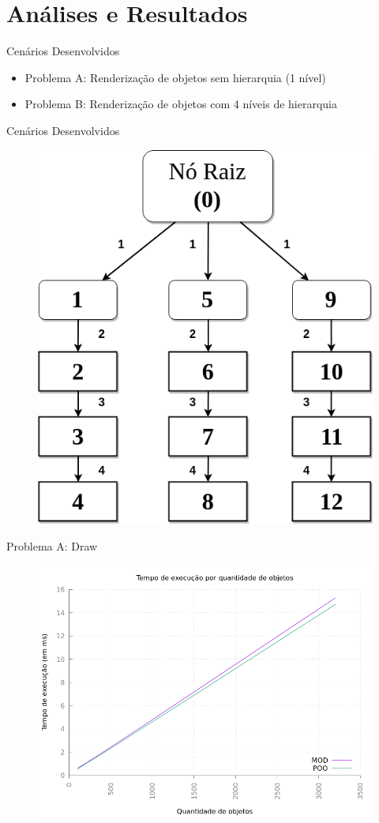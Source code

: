 \documentclass{beamer}
\begin{document}
\section{Análises e Resultados}

\frame{\tableofcontents[currentsection]}

\begin{frame}{Cenários Desenvolvidos}
    \begin{itemize}
        \item Problema A: Renderização de objetos sem hierarquia (1 nível)
        \item Problema B: Renderização de objetos com 4 níveis de hierarquia
    \end{itemize}
\end{frame}

\begin{frame}{Cenários Desenvolvidos}
    \begin{figure}[h]
        \centering
        \includegraphics[width =.45\textwidth]{figuras/problemBscheme}
        \par\medskip
    \end{figure}
\end{frame}

\begin{frame}{Problema A: Draw}
    \begin{figure}[h!]
        \centering
        \includegraphics[width =.8\textwidth]{figuras/drawv1graph}
        \par\medskip
    \end{figure}
\end{frame}
\end{document}
